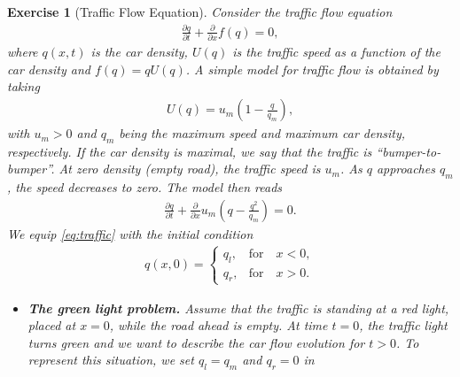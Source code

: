 \documentclass[10pt,letterpaper]{article}
\theoremstyle{break}
\newtheorem{exercise}{Exercise}
\begin{document}
\begin{exercise}[Traffic Flow Equation]
    Consider the traffic flow equation
    \begin{align}
    	\frac{\partial q}{\partial t}
    	+
    	\frac{\partial}{\partial x}
    	f(q)
    	=
    	0,
    \end{align}
    where $q(x,t)$ is the car density, $U(q)$ is the traffic speed
    as a function of the car density
    and $f(q) = q U(q)$.
    A simple model for traffic flow is obtained by taking
    \begin{align}
    	U(q)
    	=
    	u_m
    	\left(
    		1-\frac{q}{q_m}
    	\right),
    \end{align}
    with $u_m>0$ and $q_m$ being the maximum speed
    and maximum car density, respectively.
    If the car density is maximal, we say that the traffic is ``bumper-to-bumper''.
    At zero density (empty road), the traffic speed is $u_m$.
    As $q$ approaches $q_m$, the speed decreases to zero. The model then reads
    \begin{align}\label{eq:traffic}
    	\frac{\partial q}{\partial t}
    	+
    	\frac{\partial}{\partial x}
    	u_m
    	\left(
    		q-\frac{q^2}{q_m}
    	\right)
    	=
    	0.
    \end{align}
    We equip \eqref{eq:traffic} with the initial condition
    \begin{align}\label{eq:init_cond}
    	q(x,0)
    	=
    	\left\{
    	\begin{array}{cl}
    	q_l, & \text{for} \quad x<0,\\
    	q_r, &\text{for} \quad x>0.
    	\end{array}
    	\right.
    \end{align}
    \begin{itemize}
    \item[(a)] {\bf The green light problem.}
    Assume that the traffic is standing at a red light, placed at $x = 0$, while the road ahead is empty.
    At time $t = 0$, the traffic light turns green and we want to describe the car flow
    evolution for $t>0$. To represent this situation, we set $q_l = q_m$ and $q_r =0$ in

\end{itemize}
\end{exercise}
\end{document}
